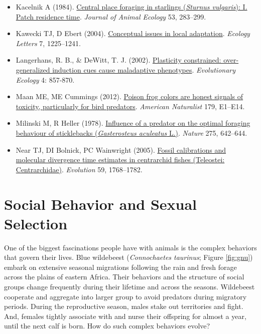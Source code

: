 \documentclass[
]{book}
\begin{document}
\begin{itemize}
\item
  Kacelnik A (1984). \href{https://www.jstor.org/stable/4357?origin=crossref\&seq=1\#metadata_info_tab_contents}{Central place foraging in starlings (\emph{Sturnus vulgaris}): I. Patch residence time}. \emph{Journal of Animal Ecology} 53, 283--299.
\item
  Kawecki TJ, D Ebert (2004). \href{https://onlinelibrary.wiley.com/doi/epdf/10.1111/j.1461-0248.2004.00684.x}{Conceptual issues in local adaptation}. \emph{Ecology Letters} 7, 1225--1241.
\item
  Langerhans, R. B., \& DeWitt, T. J. (2002). \href{https://www.evolutionary-ecology.com/abstracts/v04/1422.html}{Plasticity constrained: over-generalized induction cues cause maladaptive phenotypes}. \emph{Evolutionary Ecology} 4: 857-870.
\item
  Maan ME, ME Cummings (2012). \href{https://www.journals.uchicago.edu/doi/10.1086/663197}{Poison frog colors are honest signals of toxicity, particularly for bird predators}. \emph{American Naturalist} 179, E1--E14.
\item
  Milinski M, R Heller (1978). \href{https://www.nature.com/articles/275642a0}{Influence of a predator on the optimal foraging behaviour of sticklebacks (\emph{Gasterosteus aculeatus} L.)}. \emph{Nature} 275, 642--644.
\item
  Near TJ, DI Bolnick, PC Wainwright (2005). \href{https://onlinelibrary.wiley.com/doi/abs/10.1111/j.0014-3820.2005.tb01825.x}{Fossil calibrations and molecular divergence time estimates in centrarchid fishes (Teleostei: Centrarchidae)}. \emph{Evolution} 59, 1768--1782.
\end{itemize}

\hypertarget{social-behavior-and-sexual-selection}{%
\chapter{Social Behavior and Sexual Selection}\label{social-behavior-and-sexual-selection}}

One of the biggest fascinations people have with animals is the complex behaviors that govern their lives. Blue wildebeest (\emph{Connochaetes taurinus}; Figure \ref{fig:gnu}) embark on extensive seasonal migrations following the rain and fresh forage across the plains of eastern Africa. Their behaviors and the structure of social groups change frequently during their lifetime and across the seasons. Wildebeest cooperate and aggregate into larger group to avoid predators during migratory periods. During the reproductive season, males stake out territories and fight. And, females tightly associate with and nurse their offspring for almost a year, until the next calf is born. How do such complex behaviors evolve?
\end{document}
